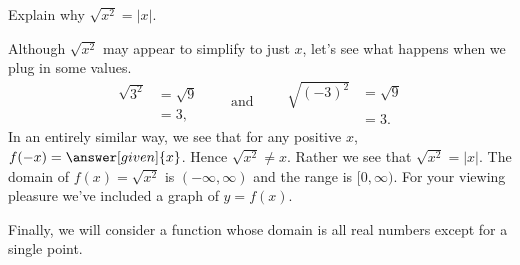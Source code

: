 \documentclass{ximera}
\begin{document}
\begin{example}
  Explain why $\sqrt{x^2} = |x|$.
  \begin{explanation}
    Although $\sqrt{x^2}$ may appear to simplify to just $x$, let's see
    what happens when we plug in some values.
    \[
    \begin{aligned}
    \sqrt{3^2} &= \sqrt{9}\\
    &=3,
    \end{aligned}
    \qquad\text{and}\qquad
    \begin{aligned}
      \sqrt{(-3)^2} &= \sqrt{9}\\
      &=3.
    \end{aligned}
    \]
    In an entirely similar way, we see that for any positive $x$, $f(-x)=\answer[given]{x}$.  Hence
    $\sqrt{x^2}\ne x$. Rather we see that $\sqrt{x^2} = |x|$.  The
    domain of $f(x)=\sqrt{x^2}$ is $(-\infty,\infty)$ and the range is
    $[0,\infty)$.  For your viewing pleasure we've included a graph of
      $y=f(x)$.
    \begin{image}
    \end{image}
  \end{explanation}
\end{example}

Finally, we will consider a function whose domain is all real numbers
except for a single point.
\end{document}
